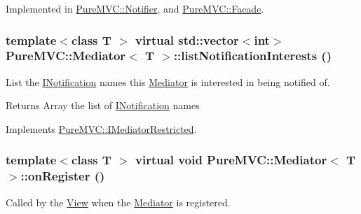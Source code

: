 Implemented in \hyperlink{class_pure_m_v_c_1_1_notifier_a6910365c70415ba7973401215f57e4af}{PureMVC::Notifier}, and \hyperlink{class_pure_m_v_c_1_1_facade_a94c72ff29f9f42ff084f247b180fb4ad}{PureMVC::Facade}.\hypertarget{class_pure_m_v_c_1_1_mediator_a95473998498b3aadf4af81fa8160ead3}{
\subsubsection[{listNotificationInterests}]{\setlength{\rightskip}{0pt plus 5cm}template$<$class T $>$ virtual std::vector$<$int$>$ {\bf PureMVC::Mediator}$<$ T $>$::listNotificationInterests ()}}
\label{class_pure_m_v_c_1_1_mediator_a95473998498b3aadf4af81fa8160ead3}


List the {\ttfamily \hyperlink{class_pure_m_v_c_1_1_i_notification}{INotification}} names this {\ttfamily \hyperlink{class_pure_m_v_c_1_1_mediator}{Mediator}} is interested in being notified of. \begin{DoxyReturn}{Returns}
Array the list of {\ttfamily \hyperlink{class_pure_m_v_c_1_1_i_notification}{INotification}} names 
\end{DoxyReturn}


Implements \hyperlink{class_pure_m_v_c_1_1_i_mediator_restricted_a9b9d790649480769697e1b3e7377c313}{PureMVC::IMediatorRestricted}.\hypertarget{class_pure_m_v_c_1_1_mediator_a35ee4974b074dbd94b5175968f31379e}{
\subsubsection[{onRegister}]{\setlength{\rightskip}{0pt plus 5cm}template$<$class T $>$ virtual void {\bf PureMVC::Mediator}$<$ T $>$::onRegister ()}}
\label{class_pure_m_v_c_1_1_mediator_a35ee4974b074dbd94b5175968f31379e}


Called by the \hyperlink{class_pure_m_v_c_1_1_view}{View} when the \hyperlink{class_pure_m_v_c_1_1_mediator}{Mediator} is registered. 

